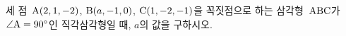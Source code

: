 세 점~$\mathrm{A}(2{,}\mkern3mu\mathopen{}1{,}\mkern3mu\mathopen{}-2)$, $\mathrm{B}(a{,}\mkern3mu\mathopen{}-1{,}\mkern3mu\mathopen{}0)$, $\mathrm{C}(1{,}\mkern3mu\mathopen{}-2{,}\mkern3mu\mathopen{}-1)$을 꼭짓점으로 하는 삼각형~$\mathrm{ABC}$가 $\angle\mathrm{A}=90^\circ$인 직각삼각형일 때, $a$의 값을 구하시오.
